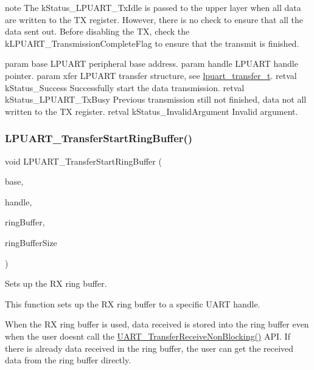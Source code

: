 note The k\+Status\+\_\+\+L\+P\+U\+A\+R\+T\+\_\+\+Tx\+Idle is passed to the upper layer when all data are written to the TX register. However, there is no check to ensure that all the data sent out. Before disabling the TX, check the k\+L\+P\+U\+A\+R\+T\+\_\+\+Transmission\+Complete\+Flag to ensure that the transmit is finished.

param base L\+P\+U\+A\+RT peripheral base address. param handle L\+P\+U\+A\+RT handle pointer. param xfer L\+P\+U\+A\+RT transfer structure, see \mbox{\hyperlink{group__lpuart__driver_ga1d4707ebc5d49dd655eedb7e5acd27fd}{lpuart\+\_\+transfer\+\_\+t}}. retval k\+Status\+\_\+\+Success Successfully start the data transmission. retval k\+Status\+\_\+\+L\+P\+U\+A\+R\+T\+\_\+\+Tx\+Busy Previous transmission still not finished, data not all written to the TX register. retval k\+Status\+\_\+\+Invalid\+Argument Invalid argument. \mbox{\label{group__lpuart__driver_ga5257b77491042af5913a8d91c66318e1}} 
\subsubsection{\texorpdfstring{LPUART\_TransferStartRingBuffer()}{LPUART\_TransferStartRingBuffer()}}
{\footnotesize\ttfamily void L\+P\+U\+A\+R\+T\+\_\+\+Transfer\+Start\+Ring\+Buffer (\begin{DoxyParamCaption}\item[{\mbox{\hyperlink{struct_l_p_u_a_r_t___type}{L\+P\+U\+A\+R\+T\+\_\+\+Type}} $\ast$}]{base,  }\item[{\mbox{\hyperlink{struct__lpuart__handle}{lpuart\+\_\+handle\+\_\+t}} $\ast$}]{handle,  }\item[{uint8\+\_\+t $\ast$}]{ring\+Buffer,  }\item[{size\+\_\+t}]{ring\+Buffer\+Size }\end{DoxyParamCaption})}



Sets up the RX ring buffer. 

This function sets up the RX ring buffer to a specific U\+A\+RT handle.

When the RX ring buffer is used, data received is stored into the ring buffer even when the user doesn\textquotesingle{}t call the \mbox{\hyperlink{group__uart__driver_gaf804acde5d73ce0a5bf54b06195e1218}{U\+A\+R\+T\+\_\+\+Transfer\+Receive\+Non\+Blocking()}} A\+PI. If there is already data received in the ring buffer, the user can get the received data from the ring buffer directly.

